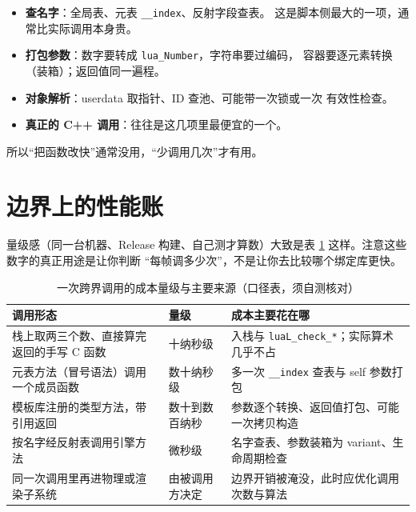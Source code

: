 \documentclass[12pt,a4paper,fontset=fandol]{ctexbook}
\newcommand{\Tp}[1]{\texttt{#1}}
\begin{document}
\begin{compare}[title={把一次调用的成本拆开看}]
\begin{itemize}
  \item \textbf{查名字}：全局表、元表 \Tp{\_\_index}、反射字段查表。
        这是脚本侧最大的一项，通常比实际调用本身贵。
  \item \textbf{打包参数}：数字要转成 \Tp{lua\_Number}，字符串要过编码，
        容器要逐元素转换（装箱）；返回值同一遍程。
  \item \textbf{对象解析}：userdata 取指针、ID 查池、可能带一次锁或一次
        有效性检查。
  \item \textbf{真正的 C++ 调用}：往往是这几项里最便宜的一个。
\end{itemize}
所以``把函数改快''通常没用，``少调用几次''才有用。
\end{compare}

\section{边界上的性能账}
\label{sec:ch14-cost}

量级感（同一台机器、Release 构建、自己测才算数）大致是表
\ref{tab:ch14-cost} 这样。注意这些数字的真正用途是让你判断
``每帧调多少次''，不是让你去比较哪个绑定库更快。

\begin{table}[htbp]
\centering
\footnotesize
\caption{一次跨界调用的成本量级与主要来源（口径表，须自测核对）}
\label{tab:ch14-cost}
\begin{tabular}{>{\raggedright\arraybackslash}p{}
                >{\raggedright\arraybackslash}p{}
                >{\raggedright\arraybackslash}p{}}
\toprule
调用形态 & 量级 & 成本主要花在哪 \\
\midrule
栈上取两三个数、直接算完返回的手写 C 函数 & 十纳秒级 & 入栈与 \Tp{luaL\_check\_*}；实际算术几乎不占 \\
元表方法（冒号语法）调用一个成员函数 & 数十纳秒级 & 多一次 \Tp{\_\_index} 查表与 self 参数打包 \\
模板库注册的类型方法，带引用返回 & 数十到数百纳秒 & 参数逐个转换、返回值打包、可能一次拷贝构造 \\
按名字经反射表调用引擎方法 & 微秒级 & 名字查表、参数装箱为 variant、生命周期检查 \\
同一次调用里再进物理或渲染子系统 & 由被调用方决定 & 边界开销被淹没，此时应优化调用次数与算法 \\
\bottomrule
\end{tabular}
\end{table}
\end{document}
